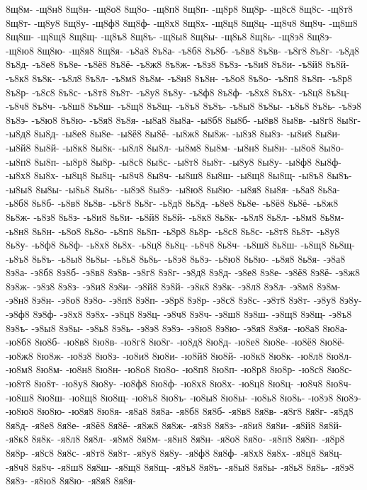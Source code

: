 {8щ8м-
-щ8н8
8щ8н-
-щ8о8
8щ8о-
-щ8п8
8щ8п-
-щ8р8
8щ8р-
-щ8с8
8щ8с-
-щ8т8
8щ8т-
-щ8у8
8щ8у-
-щ8ф8
8щ8ф-
-щ8х8
8щ8х-
-щ8ц8
8щ8ц-
-щ8ч8
8щ8ч-
-щ8ш8
8щ8ш-
-щ8щ8
8щ8щ-
-щ8ъ8
8щ8ъ-
-щ8ы8
8щ8ы-
-щ8ь8
8щ8ь-
-щ8э8
8щ8э-
-щ8ю8
8щ8ю-
-щ8я8
8щ8я-
-ъ8а8
8ъ8а-
-ъ8б8
8ъ8б-
-ъ8в8
8ъ8в-
-ъ8г8
8ъ8г-
-ъ8д8
8ъ8д-
-ъ8е8
8ъ8е-
-ъ8ё8
8ъ8ё-
-ъ8ж8
8ъ8ж-
-ъ8з8
8ъ8з-
-ъ8и8
8ъ8и-
-ъ8й8
8ъ8й-
-ъ8к8
8ъ8к-
-ъ8л8
8ъ8л-
-ъ8м8
8ъ8м-
-ъ8н8
8ъ8н-
-ъ8о8
8ъ8о-
-ъ8п8
8ъ8п-
-ъ8р8
8ъ8р-
-ъ8с8
8ъ8с-
-ъ8т8
8ъ8т-
-ъ8у8
8ъ8у-
-ъ8ф8
8ъ8ф-
-ъ8х8
8ъ8х-
-ъ8ц8
8ъ8ц-
-ъ8ч8
8ъ8ч-
-ъ8ш8
8ъ8ш-
-ъ8щ8
8ъ8щ-
-ъ8ъ8
8ъ8ъ-
-ъ8ы8
8ъ8ы-
-ъ8ь8
8ъ8ь-
-ъ8э8
8ъ8э-
-ъ8ю8
8ъ8ю-
-ъ8я8
8ъ8я-
-ы8а8
8ы8а-
-ы8б8
8ы8б-
-ы8в8
8ы8в-
-ы8г8
8ы8г-
-ы8д8
8ы8д-
-ы8е8
8ы8е-
-ы8ё8
8ы8ё-
-ы8ж8
8ы8ж-
-ы8з8
8ы8з-
-ы8и8
8ы8и-
-ы8й8
8ы8й-
-ы8к8
8ы8к-
-ы8л8
8ы8л-
-ы8м8
8ы8м-
-ы8н8
8ы8н-
-ы8о8
8ы8о-
-ы8п8
8ы8п-
-ы8р8
8ы8р-
-ы8с8
8ы8с-
-ы8т8
8ы8т-
-ы8у8
8ы8у-
-ы8ф8
8ы8ф-
-ы8х8
8ы8х-
-ы8ц8
8ы8ц-
-ы8ч8
8ы8ч-
-ы8ш8
8ы8ш-
-ы8щ8
8ы8щ-
-ы8ъ8
8ы8ъ-
-ы8ы8
8ы8ы-
-ы8ь8
8ы8ь-
-ы8э8
8ы8э-
-ы8ю8
8ы8ю-
-ы8я8
8ы8я-
-ь8а8
8ь8а-
-ь8б8
8ь8б-
-ь8в8
8ь8в-
-ь8г8
8ь8г-
-ь8д8
8ь8д-
-ь8е8
8ь8е-
-ь8ё8
8ь8ё-
-ь8ж8
8ь8ж-
-ь8з8
8ь8з-
-ь8и8
8ь8и-
-ь8й8
8ь8й-
-ь8к8
8ь8к-
-ь8л8
8ь8л-
-ь8м8
8ь8м-
-ь8н8
8ь8н-
-ь8о8
8ь8о-
-ь8п8
8ь8п-
-ь8р8
8ь8р-
-ь8с8
8ь8с-
-ь8т8
8ь8т-
-ь8у8
8ь8у-
-ь8ф8
8ь8ф-
-ь8х8
8ь8х-
-ь8ц8
8ь8ц-
-ь8ч8
8ь8ч-
-ь8ш8
8ь8ш-
-ь8щ8
8ь8щ-
-ь8ъ8
8ь8ъ-
-ь8ы8
8ь8ы-
-ь8ь8
8ь8ь-
-ь8э8
8ь8э-
-ь8ю8
8ь8ю-
-ь8я8
8ь8я-
-э8а8
8э8а-
-э8б8
8э8б-
-э8в8
8э8в-
-э8г8
8э8г-
-э8д8
8э8д-
-э8е8
8э8е-
-э8ё8
8э8ё-
-э8ж8
8э8ж-
-э8з8
8э8з-
-э8и8
8э8и-
-э8й8
8э8й-
-э8к8
8э8к-
-э8л8
8э8л-
-э8м8
8э8м-
-э8н8
8э8н-
-э8о8
8э8о-
-э8п8
8э8п-
-э8р8
8э8р-
-э8с8
8э8с-
-э8т8
8э8т-
-э8у8
8э8у-
-э8ф8
8э8ф-
-э8х8
8э8х-
-э8ц8
8э8ц-
-э8ч8
8э8ч-
-э8ш8
8э8ш-
-э8щ8
8э8щ-
-э8ъ8
8э8ъ-
-э8ы8
8э8ы-
-э8ь8
8э8ь-
-э8э8
8э8э-
-э8ю8
8э8ю-
-э8я8
8э8я-
-ю8а8
8ю8а-
-ю8б8
8ю8б-
-ю8в8
8ю8в-
-ю8г8
8ю8г-
-ю8д8
8ю8д-
-ю8е8
8ю8е-
-ю8ё8
8ю8ё-
-ю8ж8
8ю8ж-
-ю8з8
8ю8з-
-ю8и8
8ю8и-
-ю8й8
8ю8й-
-ю8к8
8ю8к-
-ю8л8
8ю8л-
-ю8м8
8ю8м-
-ю8н8
8ю8н-
-ю8о8
8ю8о-
-ю8п8
8ю8п-
-ю8р8
8ю8р-
-ю8с8
8ю8с-
-ю8т8
8ю8т-
-ю8у8
8ю8у-
-ю8ф8
8ю8ф-
-ю8х8
8ю8х-
-ю8ц8
8ю8ц-
-ю8ч8
8ю8ч-
-ю8ш8
8ю8ш-
-ю8щ8
8ю8щ-
-ю8ъ8
8ю8ъ-
-ю8ы8
8ю8ы-
-ю8ь8
8ю8ь-
-ю8э8
8ю8э-
-ю8ю8
8ю8ю-
-ю8я8
8ю8я-
-я8а8
8я8а-
-я8б8
8я8б-
-я8в8
8я8в-
-я8г8
8я8г-
-я8д8
8я8д-
-я8е8
8я8е-
-я8ё8
8я8ё-
-я8ж8
8я8ж-
-я8з8
8я8з-
-я8и8
8я8и-
-я8й8
8я8й-
-я8к8
8я8к-
-я8л8
8я8л-
-я8м8
8я8м-
-я8н8
8я8н-
-я8о8
8я8о-
-я8п8
8я8п-
-я8р8
8я8р-
-я8с8
8я8с-
-я8т8
8я8т-
-я8у8
8я8у-
-я8ф8
8я8ф-
-я8х8
8я8х-
-я8ц8
8я8ц-
-я8ч8
8я8ч-
-я8ш8
8я8ш-
-я8щ8
8я8щ-
-я8ъ8
8я8ъ-
-я8ы8
8я8ы-
-я8ь8
8я8ь-
-я8э8
8я8э-
-я8ю8
8я8ю-
-я8я8
8я8я-
}
